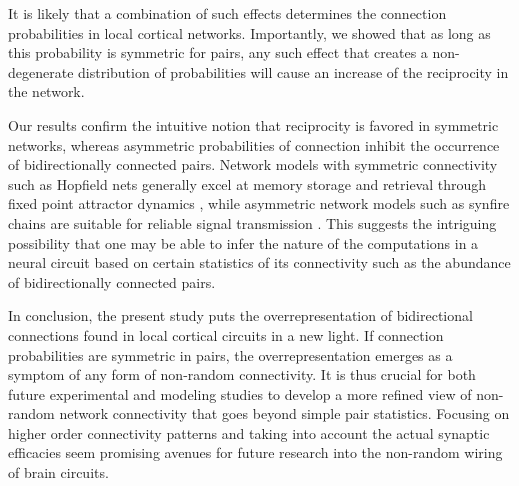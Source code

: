 It is likely that a combination of such effects determines the connection probabilities in local cortical networks.
%
Importantly, we showed that as long as this probability is symmetric for pairs, any such effect that creates a non-degenerate distribution of probabilities will cause an increase of the reciprocity in the network.

%

Our results confirm the intuitive notion that reciprocity is favored in symmetric networks, whereas asymmetric probabilities of connection inhibit the occurrence of bidirectionally connected pairs. Network models with symmetric connectivity such as Hopfield nets generally excel at memory storage and retrieval through fixed point attractor dynamics \cite{Hopfield1982}, while asymmetric network models such as synfire chains are suitable for reliable signal transmission \cite{Abeles1982, Diesmann1999}. This suggests the intriguing possibility that one may be able to infer the nature of the computations in a neural circuit based on certain statistics of its connectivity such as the abundance of bidirectionally connected pairs.

In conclusion, the present study puts the overrepresentation of bidirectional connections found in local cortical circuits in a new light.
%
If connection probabilities are symmetric in pairs, the overrepresentation emerges as a symptom of any form of non-random connectivity.
%
It is thus crucial for both future experimental and modeling studies to develop a more refined view of non-random network connectivity that goes beyond simple pair statistics. Focusing on higher order connectivity patterns and taking into account the actual synaptic efficacies seem promising avenues for future research into the non-random wiring of brain circuits.
